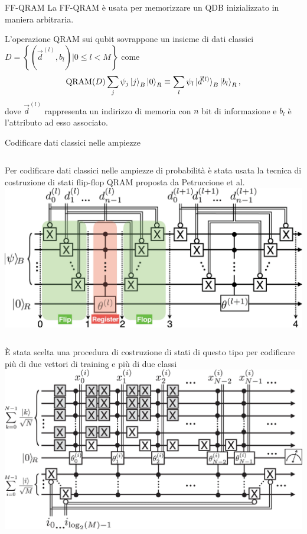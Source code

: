 \documentclass{beamer}
\begin{document}
    \begin{frame}{FF-QRAM}
        La FF-QRAM è usata per memorizzare un QDB inizializzato in maniera arbitraria. 

        L'operazione QRAM sui qubit sovrappone un insieme di dati classici 
        $D = \left\{ \left( \vec{d}^{(l)}, b_l \right) \Big| 0 \leq l < M \right\}$ come
        \begin{equation*} \label{eq:qram}
            \text{QRAM}(D) \sum_j \psi_j \ket{j}_B \ket{0}_R \equiv 
            \sum_l \psi_l \ket{\vec{d}^{(l)}}_B \ket{b_l}_R,
        \end{equation*}
        dove $\vec{d}^{(l)}$ rappresenta un indirizzo di memoria con 
        $n$ bit di informazione 
        e $b_l$ è l'attributo ad esso associato. 
    \end{frame}

    \begin{frame}{Codificare dati classici nelle ampiezze}
        \begin{columns}
            Per codificare dati classici nelle ampiezze di probabilità è stata usata la tecnica di costruzione 
            di stati flip-flop QRAM proposta da Petruccione et al. \cite{petruccione}
            \includegraphics[width=\columnwidth]{gfx/qram}
        \end{columns}

        \begin{columns}
            È stata scelta una procedura di costruzione di stati di questo tipo per codificare più di due vettori di training e più di due classi
            \includegraphics[width=\columnwidth]{gfx/qram_qsvm}
        \end{columns}
    \end{frame}
\end{document}
